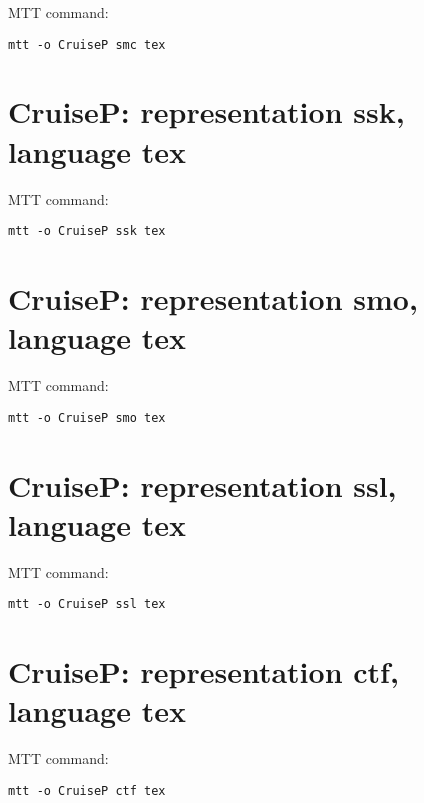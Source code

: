 MTT command:
\begin{verbatim}
mtt -o CruiseP smc tex 
\end{verbatim}
  


\section{\textbf{CruiseP}: representation \textbf{ssk}, language \textbf{tex}}
\label{sec:CruiseP_ssk.tex}


MTT command:
\begin{verbatim}
mtt -o CruiseP ssk tex 
\end{verbatim}
  


\section{\textbf{CruiseP}: representation \textbf{smo}, language \textbf{tex}}
\label{sec:CruiseP_smo.tex}


MTT command:
\begin{verbatim}
mtt -o CruiseP smo tex 
\end{verbatim}
  


\section{\textbf{CruiseP}: representation \textbf{ssl}, language \textbf{tex}}
\label{sec:CruiseP_ssl.tex}


MTT command:
\begin{verbatim}
mtt -o CruiseP ssl tex 
\end{verbatim}
  


\section{\textbf{CruiseP}: representation \textbf{ctf}, language \textbf{tex}}
\label{sec:CruiseP_ctf.tex}


MTT command:
\begin{verbatim}
mtt -o CruiseP ctf tex 
\end{verbatim}
  
